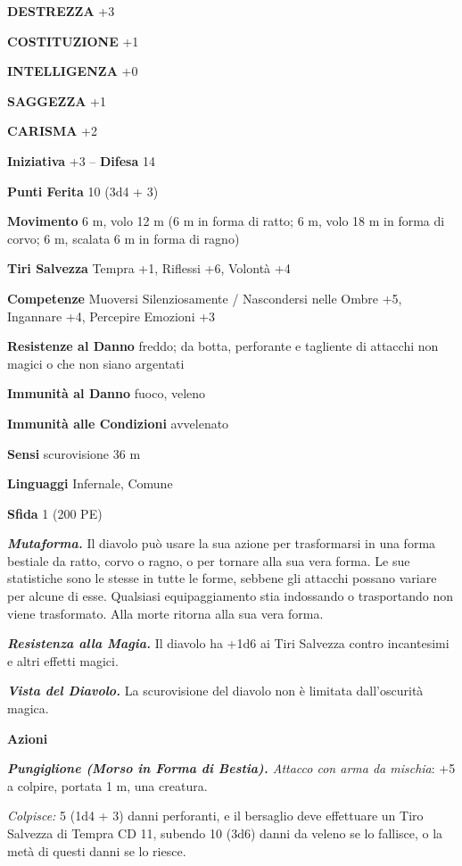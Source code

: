 \begin{multicols}{2}
\textbf{DESTREZZA} +3

\textbf{COSTITUZIONE} +1

\textbf{INTELLIGENZA} +0

\textbf{SAGGEZZA} +1

\textbf{CARISMA} +2

\textbf{Iniziativa} +3 -- \textbf{Difesa} 14

\textbf{Punti Ferita} 10 (3d4 + 3)

\textbf{Movimento} 6 m, volo 12 m (6 m in forma di ratto; 6 m, volo 18 m in forma di corvo; 6 m, scalata 6 m in forma di ragno)

\textbf{Tiri Salvezza} Tempra +1, Riflessi +6, Volontà +4

\textbf{Competenze} Muoversi Silenziosamente / Nascondersi nelle Ombre +5, Ingannare +4, Percepire Emozioni +3

\textbf{Resistenze al Danno} freddo; da botta, perforante e tagliente di attacchi non magici o che non siano argentati

\textbf{Immunità al Danno} fuoco, veleno

\textbf{Immunità alle Condizioni} avvelenato

\textbf{Sensi} scurovisione 36 m 

\textbf{Linguaggi} Infernale, Comune

\textbf{Sfida} 1 (200 PE)

\emph{\textbf{Mutaforma.}} Il diavolo può usare la sua azione per trasformarsi in una forma bestiale da ratto, corvo o ragno, o per tornare alla sua vera forma. Le sue statistiche sono le stesse in tutte le forme, sebbene gli attacchi possano variare per alcune di esse. Qualsiasi equipaggiamento stia indossando o trasportando non viene trasformato. Alla morte ritorna alla sua vera forma.

\emph{\textbf{Resistenza alla Magia.}} Il diavolo ha +1d6 ai Tiri Salvezza contro incantesimi e altri effetti magici.

\emph{\textbf{Vista del Diavolo.}} La scurovisione del diavolo non è limitata dall'oscurità magica.

\textbf{Azioni}

\emph{\textbf{Pungiglione (Morso in Forma di Bestia).} Attacco con arma da mischia}: +5 a colpire, portata 1 m, una creatura.

\emph{Colpisce:} 5 (1d4 + 3) danni perforanti, e il bersaglio deve effettuare un Tiro Salvezza di Tempra CD 11, subendo 10 (3d6) danni da veleno se lo fallisce, o la metà di questi danni se lo riesce. 


\end{multicols}
